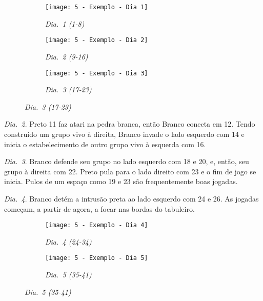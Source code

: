 \begin{figure}[h!]
  \centering
  \begin{subfigure}[t]{.3\textwidth}
    \centering
    \texttt{[image: 5 - Exemplo - Dia 1]}
    \captionsetup{justification=centering}
    \caption*{\emph{Dia.\@~1 (1-8)}}
  \end{subfigure}
  \hfill
  \begin{subfigure}[t]{.3\textwidth}
    \centering
    \texttt{[image: 5 - Exemplo - Dia 2]}
    \captionsetup{justification=centering}
    \caption*{\emph{Dia.\@~2 (9-16)}}
  \end{subfigure}
  \hfill
  \begin{subfigure}[t]{.3\textwidth}
    \centering
    \texttt{[image: 5 - Exemplo - Dia 3]}
    \captionsetup{justification=centering}
    \caption*{\emph{Dia.\@~3 (17-23)}}
  \end{subfigure}
\end{figure}

\emph{Dia.\@~2}. Preto 11 faz atari na pedra branca, então Branco conecta em 12. Tendo construído um grupo vivo à direita, Branco invade o lado esquerdo com 14 e inicia o estabelecimento de outro grupo vivo à esquerda com 16.

\emph{Dia.\@~3}. Branco defende seu grupo no lado esquerdo com 18 e 20, e, então, seu grupo à direita com 22. Preto pula para o lado direito com 23 e o fim de jogo se inicia. Pulos de um espaço como 19 e 23 são frequentemente boas jogadas.

\pagebreak

\emph{Dia.\@~4}. Branco detém a intrusão preta ao lado esquerdo com 24 e 26. As jogadas começam, a partir de agora, a focar nas bordas do tabuleiro.

\begin{figure}[h!]
  \centering
  \begin{subfigure}[t]{.3\textwidth}
    \centering
    \texttt{[image: 5 - Exemplo - Dia 4]}
    \captionsetup{justification=centering}
    \caption*{\emph{Dia.\@~4 (24-34)}}
  \end{subfigure}
  \hspace{1cm}
  \begin{subfigure}[t]{.3\textwidth}
    \centering
    \texttt{[image: 5 - Exemplo - Dia 5]}
    \captionsetup{justification=centering}
    \caption*{\emph{Dia.\@~5 (35-41)}}
  \end{subfigure}
\end{figure}

